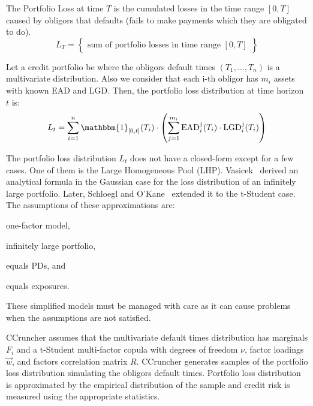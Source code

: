 \documentclass[11pt,fleqn]{book} %
\begin{document}
\begin{definition}
	The Portfolio Loss at time $T$ is the cumulated losses in the time 
	range $[0,T]$ caused by obligors that defaults (fails to make 
	payments which they are obligated to do).
	\begin{displaymath}
		L_T = \left\{
		\begin{array}{c}
			\text{sum of portfolio losses in time range $[0,T]$}
		\end{array}
		\right\}
	\end{displaymath}
\end{definition}

Let a credit portfolio be where the obligors default times $(T_1,\dots,T_n)$ 
is a multivariate distribution. Also we consider that each i-th obligor has 
$m_i$ assets with known EAD and LGD\@. Then, the portfolio loss distribution 
at time horizon $t$ is:
\begin{displaymath}
	L_t = \displaystyle \sum_{i=1}^n \mathbbm{1}_{[0,t]}(T_i) \cdot 
	\left( 
	\sum_{j=1}^{m_i} \text{EAD}_i^j(T_i) \cdot \text{LGD}_i^j(T_i)
	\right)
\end{displaymath}

The portfolio loss distribution $L_t$ does not have a closed-form except 
for a few cases. One of them is the Large Homogeneous Pool (LHP).
Vasicek~\cite{vasicek:1987} derived an analytical formula in the Gaussian 
case for the loss distribution of an infinitely large portfolio. Later, 
Schloegl and O'Kane~\cite{schloegl:2005} extended it to the t-Student 
case. The assumptions of these approximations are: 
\begin{inparaenum}[1)]
	\item one-factor model, 
	\item infinitely large portfolio, 
	\item equals PDs, and
	\item equals exposures.
\end{inparaenum}
These simplified models must be managed 
with care as it can cause problems~\cite{long:2012} when the assumptions 
are not satisfied.

CCruncher assumes that the multivariate default times distribution has
marginals $F_i$ and a t-Student multi-factor copula with degrees 
of freedom $\nu$, factor loadings $\vec{w}$, and factors correlation matrix 
$R$. CCruncher generates samples of the portfolio loss distribution simulating 
the obligors default times. Portfolio loss distribution is approximated by the 
empirical distribution of the sample and credit risk is measured using the 
appropriate statistics.
\end{document}

